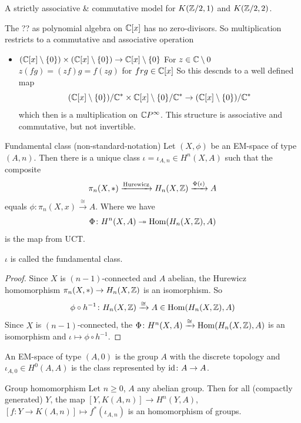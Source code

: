 \documentclass[language=english]{TemplateLecture}
\begin{document}
\begin{example}
    A strictly associative \& commutative model for \(K(\mathbb{Z}/2, 1)\) and \(K(\mathbb{Z}/2, 2)\).

    The ?? as polynomial algebra on \(\mathbb{C}[x]\) has no zero-divisors. So multiplication restricts to a commutative and associative operation
    \begin{itemize}
        \item \((\mathbb{C}[x]\setminus \{0\})\times (\mathbb{C}[x]\setminus \{0\}) \to \mathbb{C}[x]\setminus \{0\}\)
        For \(z\in \mathbb{C} \setminus 0\) \(z(fg) = (zf)g = f(zg)\) for \(frg \in \mathbb{C}[x]\) So this descnds to a well defined map
        \[(\mathbb{C}[x]\setminus \{0\})/\mathbb{C}^* \times \mathbb{C}[x]\setminus \{0\}/\mathbb{C}^* \to (\mathbb{C}[x]\setminus \{0\})/\mathbb{C}^*\]
        which then is a multiplication on \(\mathbb{C} P^\infty\). This structure is associative and commutative, but not invertible.
    \end{itemize}
\end{example}

\begin{lem}{Fundamental class (non-standard-notation)}{}
    Let \((X, \phi)\) be an EM-space of type \((A,n)\). Then there is a unique class \(\iota = \iota_{A,n}\in H^n(X,A)\) such that the composite
    \[\pi_n(X, *)\xrightarrow{\text{Hurewicz}} H_n(X,\mathbb{Z})\xrightarrow{\Phi(\iota)} A\]
    equals \(\phi\colon \pi_n(X,x)\xrightarrow{\cong} A\).
    Where we have
    \[\Phi\colon H^n(X,A)\twoheadrightarrow \operatorname{Hom}(H_n(X,\mathbb{Z}),A)\]
    is the map from UCT.

    
    \(\iota\) is called the fundamental class.
\end{lem}

\begin{proof}
Since \(X\) is \((n-1)\)-connected and \(A\) abelian, the Hurewicz homomorphism \(\pi_n(X,*)\to H_n(X,\mathbb{Z})\) is an isomorphism. So
\[\phi\circ h^{-1} \colon H_n(X,\mathbb{Z})\xrightarrow{\cong} A\in \operatorname{Hom} (H_n(X,\mathbb{Z}), A)\]
Since \(X\) is \((n-1)\)-connected, the \(\Phi\colon H^n(X,A)\xrightarrow{\cong} \operatorname{Hom}(H_n(X,\mathbb{Z}), A)\) is an isomorphism and \(\iota\mapsto \phi\circ h^{-1}\).
\end{proof}

\begin{construction}
    An EM-space of type \((A, 0)\) is the group \(A\) with the discrete topology and \(\iota_{A, 0} \in H^0(A,A)\) is the class represented by \(\operatorname{id}\colon A\to A\).
\end{construction}

\begin{thm}{Group homomorphism}{}
    Let \(n\geq 0\), \(A\) any abelian group. Then for all (compactly generated) \(Y\), the map \([Y, K(A,n)]\to H^n(Y,A)\), \([f\colon Y\to K(A,n)]\mapsto f^*(\iota_{A,n})\) is an homomorphism of groups.
\end{thm}
\end{document}
